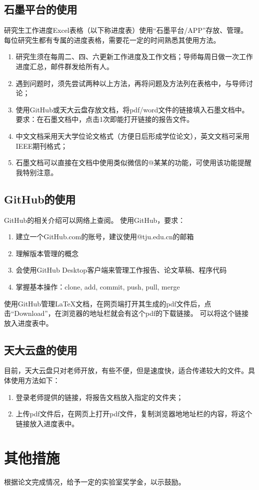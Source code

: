\subsection{石墨平台的使用}

研究生工作进度Excel表格（以下称进度表）使用“石墨平台/APP”存放、管理。
每位研究生都有专属的进度表格，需要花一定的时间熟悉其使用方法。

\begin{enumerate}
\item 研究生须在每周二、四、六更新工作进度及工作文档；导师每周日做一次工作进度汇总，邮件群发给所有人。
\item 遇到问题时，须先尝试两种以上方法，再将问题及方法列在表格中，与导师讨论；
\item 使用GitHub或天大云盘存放文档，将pdf/word文件的链接填入石墨文档中。要求：在石墨文档中，点击1次即能打开链接的报告文件。
\item 中文文档采用天大学位论文格式（方便日后形成学位论文），英文文档可采用IEEE期刊格式；
\item 石墨文档可以直接在文档中使用类似微信的@某某的功能，可使用该功能提醒我特别注意。
\end{enumerate}


\subsection{GitHub的使用}

GitHub的相关介绍可以网络上查阅。
使用GitHub，要求：

\begin{enumerate}
\item 建立一个GitHub.com的账号，建议使用@tju.edu.cn的邮箱
\item 理解版本管理的概念
\item 会使用GitHub Desktop客户端来管理工作报告、论文草稿、程序代码
\item 掌握基本操作：clone, add, commit, push, pull, merge 
\end{enumerate}

使用GitHub管理LaTeX文档，在网页端打开其生成的pdf文件后，点击“Download”，在浏览器的地址栏就会有这个pdf的下载链接。
可以将这个链接放入进度表中。


\subsection{天大云盘的使用}

目前，天大云盘只对老师开放，有些不便，但是速度快，适合传递较大的文件。具体使用方法如下：

\begin{enumerate}
\item 登录老师提供的链接，将报告文档放入指定的文件夹；
\item 上传pdf文件后，在网页上打开pdf文件，复制浏览器地地址栏的内容，将这个链接放入进度表中。
\end{enumerate}


\section{其他措施}

根据论文完成情况，给予一定的实验室奖学金，以示鼓励。






